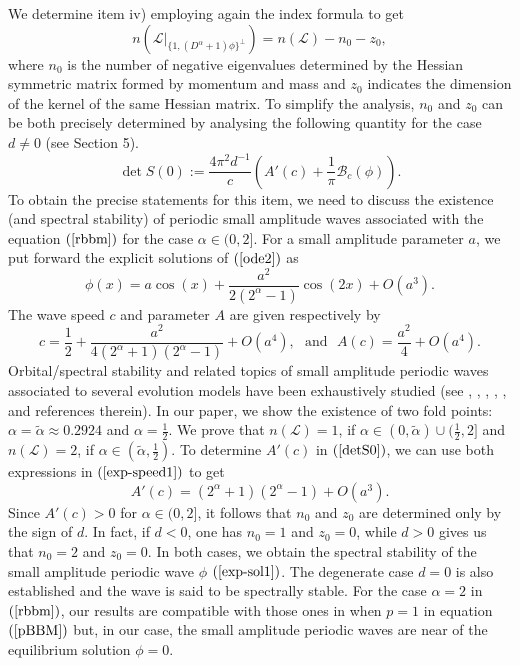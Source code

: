 \documentclass[12pt,reqno]{amsart}
\newcommand{\2}{L^2_{per}(0, T)}
\numberwithin{equation}{section}
\numberwithin{figure}{section}
\begin{document}
\indent We determine item iv) employing again the index formula to get
$$n(\mathcal{L}|_{\{1,(D^{\alpha}+1)\phi\}^{\bot}})=n(\mathcal{L})-n_0-z_0,$$
where $n_0$ is the number of negative eigenvalues determined by the Hessian symmetric matrix formed by momentum and mass and $z_0$ indicates the dimension of the kernel of the same Hessian matrix. To simplify the analysis, $n_0$ and $z_0$ can be both precisely determined by analysing the following quantity for the case $d\neq0$ (see Section 5).
\begin{equation}\label{detS0}\det S(0):= \frac{4\pi^2d^{-1}}{c} \left(A'(c)+ \frac{1}{\pi}\mathcal{B}_c(\phi) \right).\end{equation}
 \indent To obtain the precise statements for this item, we need to discuss the existence (and spectral stability) of periodic small amplitude waves associated with the equation $(\ref{rbbm})$ for the case $\alpha\in (0,2]$. For a small amplitude parameter $a$, we put forward the explicit solutions of  $(\ref{ode2})$ as
\begin{equation}\label{exp-sol1}
	\phi(x)= a\cos(x) + \frac{a^2}{2(2^{\alpha} -1)} \cos(2x) + O(a^3).
\end{equation}
The wave speed $c$ and parameter $A$ are given respectively by
\begin{equation}\label{exp-speed1}
	c= \frac{1}{2} + \frac{a^2}{4(2^\alpha +1)(2^\alpha -1)} + O(a^4),\ \ \ \mbox{and}\ \ \
	A(c) = \frac{a^2}{4} + O(a^4).
\end{equation}
Orbital/spectral stability and related topics of small amplitude periodic waves associated to several evolution models have been exhaustively studied  (see \cite{haragus1}, \cite{HP}, \cite{johnson13}, \cite{LP}, \cite{NPL}, and references therein). In our paper, we show the existence of two fold points: $\alpha=\tilde{\alpha}\approx 0.2924$ and $\alpha=\frac{1}{2}$. We prove that $n(\mathcal{L})=1$, if $\alpha\in(0,\tilde{\alpha})\cup (\frac{1}{2},2]$ and $n(\mathcal{L})=2$, if $\alpha\in(\tilde{\alpha},\frac{1}{2})$. To determine $A'(c)$ in $(\ref{detS0})$, we can use both expressions in $(\ref{exp-speed1})$ to get
\begin{equation}\label{deriv-ci}
	A'(c)= (2^\alpha +1)(2^\alpha -1) + O(a^3).
\end{equation}
Since $A'(c)>0$ for $\alpha\in (0,2]$, it follows that $n_0$ and $z_0$ are determined only by the sign of $d$. In fact, if $d<0$, one has $n_0=1$ and $z_0=0$, while $d>0$ gives us that $n_0=2$ and $z_0=0$. In both cases, we obtain the spectral stability of the small amplitude periodic wave $\phi$ $(\ref{exp-sol1})$. The degenerate case $d=0$ is also established and the wave is said to be spectrally stable. For the case $\alpha=2$ in $(\ref{rbbm})$, our results are compatible with those ones in \cite{haragus} when $p=1$ in equation $(\ref{pBBM})$ but, in our case, the small amplitude periodic waves are near of the equilibrium solution $\phi=0$.\\
\end{document}
